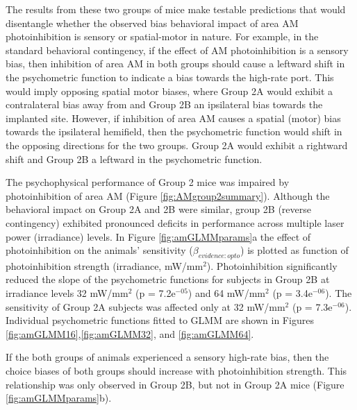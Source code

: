 The results from these two groups of mice make testable predictions that would disentangle whether the observed bias behavioral impact of area AM photoinhibition is sensory or spatial-motor in nature. For example, in the standard behavioral contingency, if the effect of AM photoinhibition is a sensory bias, then inhibition of area AM in both groups should cause a leftward shift in the psychometric function to indicate a bias towards the high-rate port. This would imply opposing spatial motor biases, where Group 2A would exhibit a contralateral bias away from and Group 2B an ipsilateral bias towards the implanted site. However, if inhibition of area AM causes a spatial (motor) bias towards the ipsilateral hemifield, then the psychometric function would shift in the opposing directions for the two groups. Group 2A would exhibit a rightward shift and Group 2B a leftward in the psychometric function. \par 

The psychophysical performance of Group 2 mice was impaired by photoinhibition of area AM (Figure \ref{fig:AMgroup2summary}). Although the behavioral impact on Group 2A and 2B were similar, group 2B (reverse contingency) exhibited pronounced deficits in performance across multiple laser power (irradiance) levels. In Figure \ref{fig:amGLMMparams}a the effect of photoinhibition on the animals' sensitivity ($\beta_{evidence:opto}$) is plotted as function of photoinhibition strength (irradiance, mW/mm$^{2}$). Photoinhibition significantly reduced the slope of the psychometric functions for subjects in Group 2B at irradiance levels 32 mW/mm$^{2}$ (p = 7.2e$^{-05}$) and 64 mW/mm$^{2}$ (p = 3.4e$^{-06}$). The sensitivity of Group 2A subjects was affected only at 32 mW/mm$^{2}$ (p = 7.3e$^{-06}$). Individual psychometric functions fitted to GLMM are shown in Figures \ref{fig:amGLMM16},\ref{fig:amGLMM32}, and \ref{fig:amGLMM64}. \par 

If the both groups of animals experienced a sensory high-rate bias, then the choice biases of both groups should increase with photoinhibition strength. This relationship was only observed in Group 2B, but not in Group 2A mice (Figure \ref{fig:amGLMMparams}b). \par 

